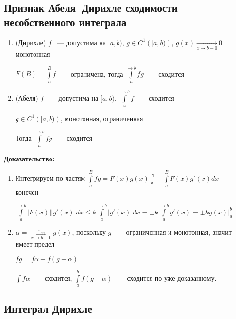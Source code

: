 \documentclass[../main.tex]{subfiles}
\begin{document}
\subsection{Признак Абеля--Дирихле сходимости несобственного интеграла}

\begin{enumerate}

\item (Дирихле) $f$ ~--- допустима на $[a, b)$, $g \in C^1 \left( [a, b) \right)$, $g(x) \xrightarrow[x \rightarrow b - 0]{} 0$ монотонная

    $F(B) = \int\limits^B_a f$ ~--- ограничена, тогда $\int\limits^{\rightarrow b}_a fg$ ~--- сходится
    
\item (Абеля) $f$ ~--- допустима на $[a, b)$, $\int\limits^{\rightarrow b}_a f$ ~--- сходится

    $g \in C^1 \left([a, b) \right)$, монотонная, ограниченная
    
    Тогда $\int\limits^{\rightarrow b}_a fg$ ~--- сходится

\end{enumerate}

\textbf{Доказательство:}
        
\begin{enumerate}

\item Интегрируем по частям $\int\limits^B_a fg = F(x) g(x) \bigg|^B_a - \int\limits^B_a F(x) g'(x) dx$ ~--- конечен

$\int\limits^{\rightarrow b}_a \left| F(x) \right| | g'(x) | dx \leq k \int\limits^{\rightarrow b}_a | g'(x) | dx = \pm k \int\limits^{\rightarrow b}_a g'(x) = \pm k g(x) \bigg|^b_a$

\item $\alpha = \lim\limits_{x \rightarrow b- 0} g(x)$, поскольку $g$ ~--- ограниченная и монотонная, значит имеет предел

$fg = f \alpha + f(g - \alpha)$

$\int f \alpha$ ~--- сходится, $\int\limits^b_a f(g - \alpha)$ ~--- сходится по уже доказанному.

\end{enumerate}


\newpage


\subsection{Интеграл Дирихле}
\end{document}
